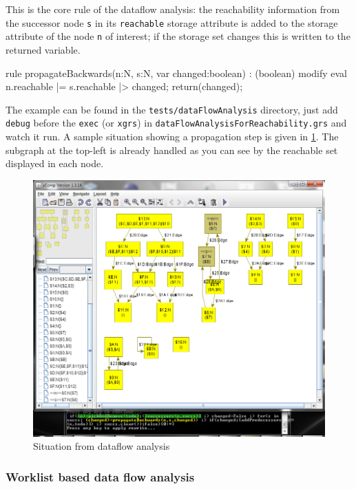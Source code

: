   \begin{example}
This is the core rule of the dataflow analysis: the reachability information from the successor node \texttt{s} in its \texttt{reachable} storage attribute is added to the storage attribute of the node \texttt{n} of interest; if the storage set changes this is written to the returned variable.
    \begin{grgen}
rule propagateBackwards(n:N, s:N, var changed:boolean) : (boolean)
{
  modify {
    eval { n.reachable |= s.reachable |> changed; }
    return(changed);
  }
}
    \end{grgen}
  \end{example}

The example can be found in the \texttt{tests/dataFlowAnalysis} directory, just add \texttt{debug} before the \texttt{exec} (or \texttt{xgrs}) in \texttt{dataFlowAnalysisForReachability.grs} and watch it run.
A sample situation showing a propagation step is given in \ref{figdataflow}.
The subgraph at the top-left is already handled as you can see by the reachable set displayed in each node.

\begin{figure}[htbp]
  \centering
  \includegraphics[width=\textwidth]{fig/Dataflow}
  \caption{Situation from dataflow analysis}
  \label{figdataflow}
\end{figure}

\subsubsection*{Worklist based data flow analysis}

